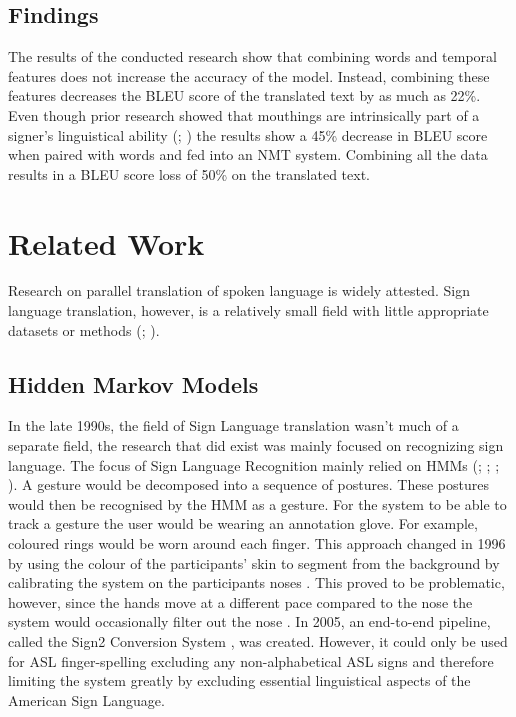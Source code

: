 \subsection{Findings}

The results of the conducted research show that combining words and temporal features does not increase the accuracy of the model. Instead, combining these features decreases the BLEU score of the translated text by as much as 22\%. Even though prior research showed that mouthings are intrinsically part of a signer's linguistical ability (\citealp{pfaff1979constraints};  \citealp{konradoffentliches}) the results show a 45\% decrease in BLEU score when paired with words and fed into an NMT system. Combining all the data results in a BLEU score loss of 50\% on the translated text.

\section{Related Work}

Research on parallel translation of spoken language is widely attested. Sign language translation, however, is a relatively small field with little appropriate datasets or methods (\citealp{camgoz2021content4all}; \citealp{bragg2019sign}).

\subsection{Hidden Markov Models}
In the late 1990s, the field of Sign Language translation wasn't much of a separate field, the research that did exist was mainly focused on recognizing sign language. The focus of Sign Language Recognition mainly relied on HMMs (\citealp{hiddenmarkov1l}; \citealp{hiddenmarkov2}; \citealp{hiddenmarkov3}; \citealp{holden2005australian}). A gesture would be decomposed into a sequence of postures. These postures would then be recognised by the HMM as a gesture. For the system to be able to track a gesture the user would be wearing an annotation glove. For example, coloured rings would be worn around each finger. This approach changed in 1996 by using the colour of the participants' skin to segment from the background by calibrating the system on the participants noses \cite{starner1998real}. This proved to be problematic, however, since the hands move at a different pace compared to the nose the system would occasionally filter out the nose \cite{starner1998real}. In 2005, an end-to-end pipeline, called the Sign2 Conversion System \cite{glenn2005image}, was created. However, it could only be used for ASL finger-spelling excluding any non-alphabetical ASL signs and therefore limiting the system greatly by excluding essential linguistical aspects of the American Sign Language.


